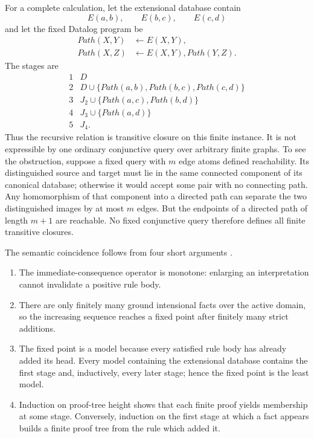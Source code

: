 For a complete calculation, let the extensional database contain
\[
 E(a,b),\qquad E(b,c),\qquad E(c,d)
\]
and let the fixed Datalog program be
\[
\begin{aligned}
 Path(X,Y)&\leftarrow E(X,Y),\\
 Path(X,Z)&\leftarrow E(X,Y),Path(Y,Z).
\end{aligned}
\]
The stages are
\[
\begin{array}{c|l}
1 & D\\
2 & D\cup\{Path(a,b),Path(b,c),Path(c,d)\}\\
3 & J_2\cup\{Path(a,c),Path(b,d)\}\\
4 & J_3\cup\{Path(a,d)\}\\
5 & J_4.
\end{array}
\]
Thus the recursive relation is transitive closure on this finite instance.
It is not expressible by one ordinary conjunctive query over arbitrary finite
graphs.  To see the obstruction, suppose a fixed query with \(m\) edge atoms
defined reachability.  Its distinguished source and target must lie in the
same connected component of its canonical database; otherwise it would accept
some pair with no connecting path.  Any homomorphism of that component into a
directed path can separate the two distinguished images by at most \(m\)
edges.  But the endpoints of a directed path of length \(m+1\) are reachable.
No fixed conjunctive query therefore defines all finite transitive closures.

The semantic coincidence follows from four short arguments
\cite[chs.~12--13]{AbiteboulHullVianu1995}.

\begin{enumerate}
\item The immediate-consequence operator is monotone: enlarging an
interpretation cannot invalidate a positive rule body.
\item There are only finitely many ground intensional facts over the active
domain, so the increasing sequence reaches a fixed point after finitely many
strict additions.
\item The fixed point is a model because every satisfied rule body has already
added its head.  Every model containing the extensional database contains the
first stage and, inductively, every later stage; hence the fixed point is the
least model.
\item Induction on proof-tree height shows that each finite proof yields
membership at some stage.  Conversely, induction on the first stage at which a
fact appears builds a finite proof tree from the rule which added it.
\end{enumerate}

